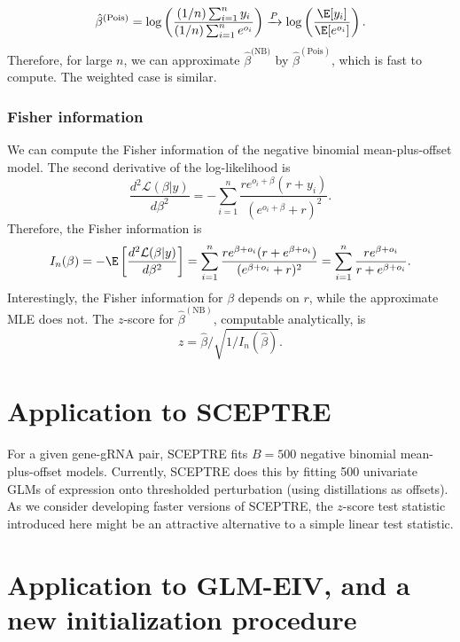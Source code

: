\documentclass[12pt]{article}
\begin{document}
 $$ \hat{\beta}^{(\textrm{Pois})} =  \log \left( \frac{ (1/n) \sum_{i=1}^n y_i }{ (1/n) \sum_{i=1}^n e^{o_i} } \right) \xrightarrow{P} \log \left( \frac{ \E[y_i] }{ \E[ e^{o_i} ] } \right) .$$ Therefore, for large $n$, we can approximate $\hat{\beta}^{\textrm{(NB)}}$ by $\hat{\beta}^{(\textrm{Pois})}$, which is fast to compute. The weighted case is similar.
 
 \subsubsection{Fisher information}
 
 We can compute the Fisher information of the negative binomial mean-plus-offset model. The second derivative of the log-likelihood is
 $$ \frac{d^2 \mathcal{L}(\beta | y) }{d \beta^2} = - \sum_{i=1}^n \frac{ r e^{o_i + \beta}(r + y_i)}{ \left(e^{o_i + \beta} + r\right)^2 }.$$ Therefore, the Fisher information is
 \begin{multline*} I_n(\beta) = - \E \left[ \frac{d^2 \mathcal{L}(\beta | y) }{d \beta^2}  \right] = \sum_{i=1}^n \frac{ r e^{\beta + o_i} (r + e^{\beta + o_i} )}{ (e^{ \beta + o_i} + r )^2} = \sum_{i=1}^n \frac{ r e^{\beta + o_i} }{r + e^{\beta + o_i}}.
 \end{multline*}
Interestingly, the Fisher information for $\beta$ depends on $r$, while the approximate MLE does not. The $z$-score for $\hat{\beta}^{(\textrm{NB})}$, computable analytically, is 
\begin{equation}\label{z_score}
z = \hat{\beta}/\sqrt{ 1 / I_n(\hat{\beta})}.
\end{equation}
\section{Application to SCEPTRE}

For a given gene-gRNA pair, SCEPTRE fits $B = 500$ negative binomial mean-plus-offset models. Currently, SCEPTRE does this by fitting 500 univariate GLMs of expression onto thresholded perturbation (using distillations as offsets). %
As we consider developing faster versions of SCEPTRE, the $z$-score test statistic introduced here might be an attractive alternative to a simple linear test statistic. 
 
\section{Application to GLM-EIV, and a new initialization procedure}
 
\end{document}
